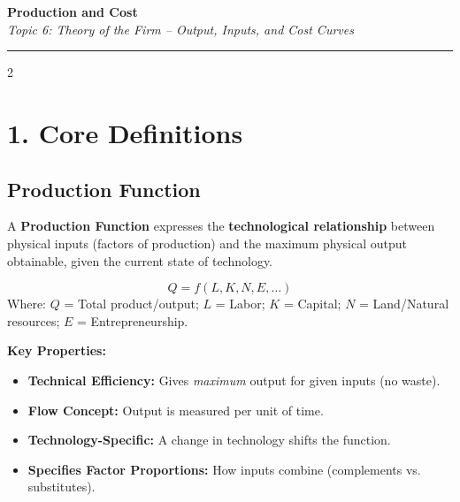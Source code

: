 \documentclass[10pt,a4paper]{article}
\begin{document}
\begin{center}
{\LARGE \textbf{Production and Cost}}\\[0.15cm]
{\normalsize \textit{Topic 6: Theory of the Firm -- Output, Inputs, and Cost Curves}}\\[0.15cm]
\hrule
\end{center}
\vspace{-0.3cm}

\begin{multicols}{2}
\footnotesize

\section*{1. Core Definitions}

\subsection*{Production Function}
A \textbf{Production Function} expresses the \textbf{technological relationship} between physical inputs (factors of production) and the maximum physical output obtainable, given the current state of technology.

\[
Q = f(L, K, N, E, \dots)
\]
Where: $Q$ = Total product/output; $L$ = Labor; $K$ = Capital; $N$ = Land/Natural resources; $E$ = Entrepreneurship.

\textbf{Key Properties:}
\begin{itemize}[leftmargin=*,nosep]
    \item \textbf{Technical Efficiency:} Gives \textit{maximum} output for given inputs (no waste).
    \item \textbf{Flow Concept:} Output is measured per unit of time.
    \item \textbf{Technology-Specific:} A change in technology shifts the function.
    \item \textbf{Specifies Factor Proportions:} How inputs combine (complements vs. substitutes).
\end{itemize}


\end{multicols}
\end{document}
